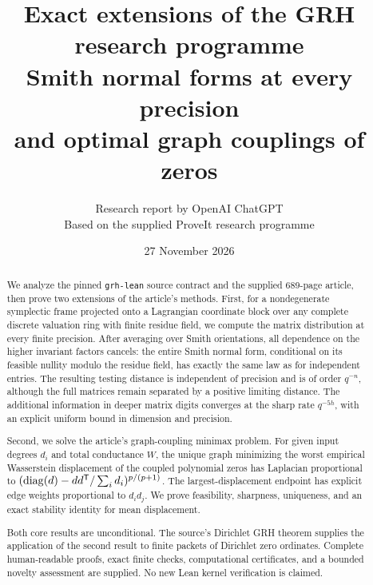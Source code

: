 \documentclass[11pt]{article}
\title{\textbf{Exact extensions of the GRH research programme}\\[.5em]
\large Smith normal forms at every precision\\
and optimal graph couplings of zeros}
\author{Research report by OpenAI ChatGPT\\
\small Based on the supplied ProveIt research programme}
\date{27 November 2026}
\begin{document}
\maketitle
\begin{abstract}
We analyze the pinned \texttt{grh-lean} source contract and the supplied
689-page article, then prove two extensions of the article's methods.
First, for a nondegenerate symplectic frame projected onto a Lagrangian
coordinate block over any complete discrete valuation ring with finite
residue field, we compute the matrix distribution at every finite precision.
After averaging over Smith orientations, all dependence on the higher
invariant factors cancels: the entire Smith normal form, conditional on
its feasible nullity modulo the residue field, has exactly the same law as
for independent entries. The resulting testing distance is independent of
precision and is of order \(q^{-n}\), although the full matrices remain
separated by a positive limiting distance. The additional information in
deeper matrix digits converges at the sharp rate \(q^{-5h}\), with an
explicit uniform bound in dimension and precision.

Second, we solve the article's graph-coupling minimax problem. For given
input degrees \(d_i\) and total conductance \(W\), the unique graph minimizing
the worst empirical Wasserstein displacement of the coupled polynomial
zeros has Laplacian proportional to
\((\operatorname{diag}(d)-dd^{\mathsf T}/\sum_i d_i)^{p/(p+1)}\).
The largest-displacement endpoint has explicit edge weights proportional
to \(d_i d_j\). We prove feasibility, sharpness, uniqueness, and an exact
stability identity for mean displacement.

Both core results are unconditional. The source's Dirichlet GRH theorem
supplies the application of the second result to finite packets of
Dirichlet zero ordinates. Complete human-readable proofs, exact finite
checks, computational certificates, and a bounded novelty assessment
are supplied. No new Lean kernel verification is claimed.
\end{abstract}
\newpage
\tableofcontents
\newpage

\clearpage

\clearpage

\clearpage

\clearpage

\end{document}
